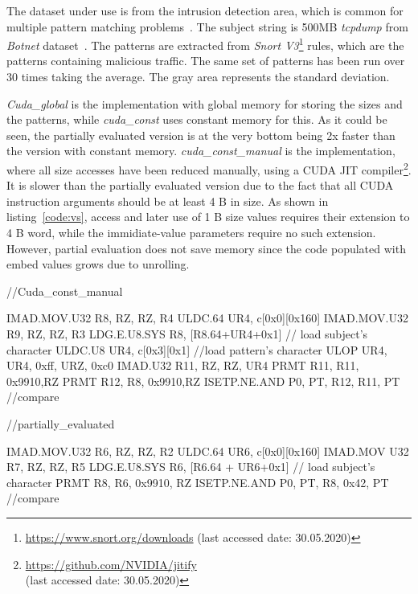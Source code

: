 The dataset under use is from the intrusion detection area, which is common for multiple pattern matching problems~\cite{Aho-Corasick}. 
The subject string is 500MB \emph{tcpdump} from \emph{Botnet} 
dataset~\cite{Ring_2019}. The patterns are extracted from 
\emph{Snort V3}\footnote{\url{https://www.snort.org/downloads} (last accessed date: 30.05.2020)} 
rules, which are the patterns containing malicious traffic. 
The same set of patterns has been run over 30 times taking the average. 
The gray area represents the standard deviation.

\emph{Cuda\_global} is the implementation with global memory for storing the sizes 
and the patterns, while \emph{cuda\_const} uses constant memory for this. 
As it could be seen, the partially evaluated version is at the very 
bottom being 2x faster than the version with constant memory. 
\emph{cuda\_const\_manual} is the implementation, where all size accesses 
have been reduced manually, using a CUDA JIT 
compiler\footnote{\url{https://github.com/NVIDIA/jitify} \\(last accessed date: 30.05.2020)}. 
It is slower than the partially evaluated version due to the fact that all CUDA instruction arguments should be at least 4 B in size.
As shown in listing~\ref{code:vs}, access and later use of 1 B size values requires their extension to 4 B word, while 
the immidiate-value parameters require no such extension. However, partial evaluation does not save memory since the 
code populated with embed values grows due to unrolling.

\begin{listing}
    \begin{pyglist}[language=C,caption=Cuda\_const\_manual vs partially\_evaluated,label=code:vs]
        //Cuda_const_manual
    
IMAD.MOV.U32 R8, RZ, RZ, R4 
ULDC.64 UR4, c[0x0][0x160]
IMAD.MOV.U32 R9, RZ, RZ, R3
LDG.E.U8.SYS R8, [R8.64+UR4+0x1] // load subject's character
ULDC.U8 UR4, c[0x3][0x1] //load pattern's character
ULOP UR4, UR4, 0xff, URZ, 0xc0
IMAD.U32 R11, RZ, RZ, UR4
PRMT R11, R11, 0x9910,RZ
PRMT R12, R8, 0x9910,RZ
ISETP.NE.AND P0, PT, R12, R11, PT //compare

    //partially_evaluated

IMAD.MOV.U32 R6, RZ, RZ, R2 
ULDC.64 UR6, c[0x0][0x160] 
IMAD.MOV U32 R7, RZ, RZ, R5 
LDG.E.U8.SYS R6, [R6.64 + UR6+0x1] // load subject's character
PRMT R8, R6, 0x9910, RZ
ISETP.NE.AND P0, PT, R8, 0x42, PT //compare
    
    \end{pyglist}
    \end{listing}


